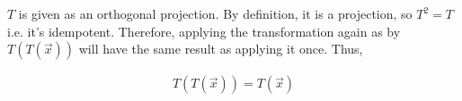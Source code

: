 \documentclass[letterpaper,12pt]{report}
\begin{document}
$T$ is given as an orthogonal projection. By definition, it is a projection, so $T^2 = T$ i.e. it's idempotent. Therefore, applying the transformation again as by $T(T(\vec{x}))$ will have the same result as applying it once. Thus,

\begin{align*}
  T(T(\vec{x})) = T(\vec{x})
\end{align*}
\end{document}
